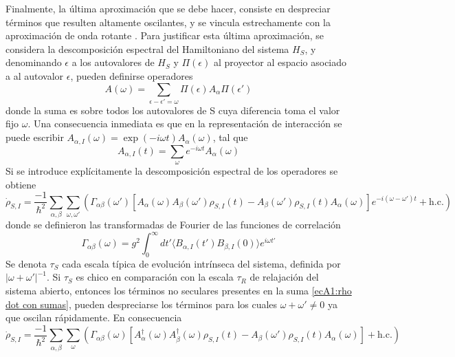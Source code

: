 Finalmente, la última aproximación que se debe hacer, consiste en despreciar términos que resulten altamente oscilantes, y se vincula estrechamente con la aproximación de onda rotante \cite{115}. Para justificar esta última aproximación, se considera la descomposición espectral del Hamiltoniano del sistema $H_S$, y denominando $\epsilon$ a los autovalores de $H_S$ y $\Pi(\epsilon)$ al proyector al espacio asociado a al autovalor $\epsilon$, pueden definirse operadores
\begin{equation}
    A(\omega) = \sum_{\epsilon-\epsilon'=\omega}\Pi(\epsilon)A_\alpha\Pi(\epsilon')
\end{equation}
donde la suma es sobre todos los autovalores de S cuya diferencia toma el valor fijo $\omega$. Una consecuencia inmediata es que en la representación de interacción se puede escribir $A_{\alpha,I}(\omega)=\exp(-i\omega t)A_\alpha(\omega)$, tal que
\begin{equation}
    A_{\alpha,I}(t)=\sum_\omega e^{-i\omega t}A_{\alpha}(\omega)
\end{equation}
Si se introduce explícitamente la descomposición espectral de los operadores se obtiene
\begin{equation}
    \dot \rho_{S,I}=\frac{-1}{\hbar^2}\sum_{\alpha,\beta}\sum_{\omega,\omega'} \left( \Gamma_{\alpha\beta}(\omega')[A_\alpha(\omega)A_\beta(\omega')\rho_{S,I}(t)-A_\beta(\omega')\rho_{S,I}(t)A_\alpha(\omega)]e^{-i(\omega-\omega')t}+\text{h.c.} \right)
    \label{ecA1:rho dot con sumas}
\end{equation}
donde se definieron las transformadas de Fourier de las funciones de correlación
\begin{equation}
    \Gamma_{\alpha\beta}(\omega) = g^2 \int_0^\infty dt' \langle B_{\alpha,I}(t')B_{\beta,I}(0) \rangle e^{i\omega t'}
\end{equation}
Se denota $\tau_S$ cada escala típica de evolución intrínseca del sistema, definida por $|\omega+\omega'|^{-1}$. Si $\tau_S$ es chico en comparación con la escala $\tau_R$ de relajación del sistema abierto, entonces los términos no seculares presentes en la suma \ref{ecA1:rho dot con sumas}, pueden despreciarse los términos para los cuales $\omega+\omega'\neq 0$ ya que oscilan rápidamente. En consecuencia
\begin{equation}
    \dot \rho_{S,I}=\frac{-1}{\hbar^2}\sum_{\alpha,\beta}\sum_{\omega} \left( \Gamma_{\alpha\beta}(\omega)[A^\dagger_\alpha(\omega)A^\dagger_\beta(\omega)\rho_{S,I}(t)-A_\beta(\omega')\rho_{S,I}(t)A_\alpha(\omega)]+\text{h.c.} \right)
    \label{ecA1:rho dot con sumas 2}
\end{equation}

